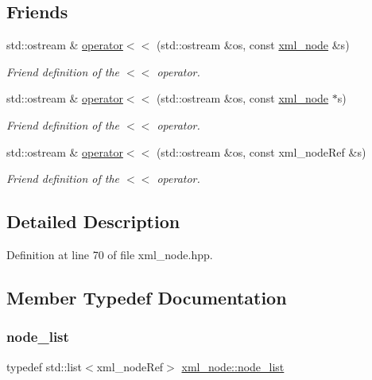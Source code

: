 \subsection*{Friends}
\begin{DoxyCompactItemize}
\item 
std\+::ostream \& \hyperlink{classxml__node_a7233e8e22aa1f77f4928d7c9a0101f18}{operator$<$$<$} (std\+::ostream \&os, const \hyperlink{classxml__node}{xml\+\_\+node} \&s)
\begin{DoxyCompactList}\small\item\em Friend definition of the $<$$<$ operator. \end{DoxyCompactList}\item 
std\+::ostream \& \hyperlink{classxml__node_af77e55c29cc5e64eab6fe374312e2443}{operator$<$$<$} (std\+::ostream \&os, const \hyperlink{classxml__node}{xml\+\_\+node} $\ast$s)
\begin{DoxyCompactList}\small\item\em Friend definition of the $<$$<$ operator. \end{DoxyCompactList}\item 
std\+::ostream \& \hyperlink{classxml__node_a3acaf27c268e55db5cd8dac82ccc8389}{operator$<$$<$} (std\+::ostream \&os, const xml\+\_\+node\+Ref \&s)
\begin{DoxyCompactList}\small\item\em Friend definition of the $<$$<$ operator. \end{DoxyCompactList}\end{DoxyCompactItemize}


\subsection{Detailed Description}


Definition at line 70 of file xml\+\_\+node.\+hpp.



\subsection{Member Typedef Documentation}
\mbox{\label{classxml__node_a4e558f6b9e873e9d0e92cfc8e7880385}} 
\subsubsection{\texorpdfstring{node\+\_\+list}{node\_list}}
{\footnotesize\ttfamily typedef std\+::list$<$xml\+\_\+node\+Ref$>$ \hyperlink{classxml__node_a4e558f6b9e873e9d0e92cfc8e7880385}{xml\+\_\+node\+::node\+\_\+list}}



